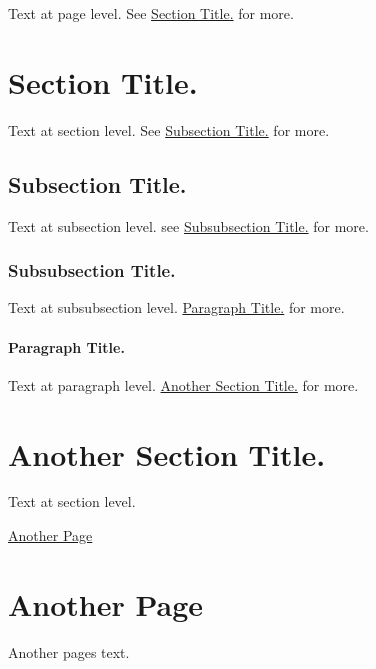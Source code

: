 Text at page level. See \hyperlink{mypage_mysect}{Section Title.} for more. \hypertarget{mypage_mysect}{}\section{Section Title.}\label{mypage_mysect}
Text at section level. See \hyperlink{mypage_mysubsect}{Subsection Title.} for more. \hypertarget{mypage_mysubsect}{}\subsection{Subsection Title.}\label{mypage_mysubsect}
Text at subsection level. see \hyperlink{mypage_mysubsubsect}{Subsubsection Title.} for more. \hypertarget{mypage_mysubsubsect}{}\subsubsection{Subsubsection Title.}\label{mypage_mysubsubsect}
Text at subsubsection level. \hyperlink{mypage_mypara}{Paragraph Title.} for more. \hypertarget{mypage_mypara}{}\paragraph{Paragraph Title.}\label{mypage_mypara}
Text at paragraph level. \hyperlink{mypage_mysect2}{Another Section Title.} for more. \hypertarget{mypage_mysect2}{}\section{Another Section Title.}\label{mypage_mysect2}
Text at section level.

\hyperlink{another}{Another Page} \hypertarget{another}{}\section{Another Page}\label{another}
Another page\textquotesingle{}s text. 